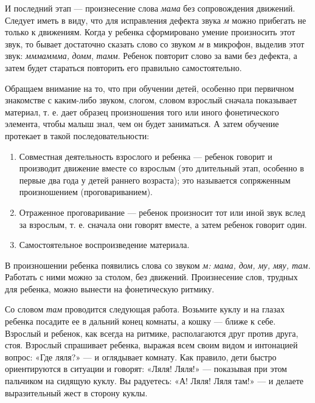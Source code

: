 \documentclass[a5paper]{book}
\renewcommand{\emph}[1]{\textit{#1}}
\begin{document}
И последний этап --- произнесение слова \emph{мама} без сопровождения
движений. Следует иметь в виду, что для исправления дефекта звука
\emph{м} можно прибегать не только к движениям. Когда у ребенка
сформировано умение произносить этот звук, то бывает достаточно сказать
слово со звуком \emph{м} в микрофон, выделив этот звук: \emph{мммаммма,}
\emph{домм}, \emph{тамм}. Ребенок повторит слово за вами без дефекта, а
затем будет стараться повторить его правильно самостоятельно.

Обращаем внимание на то, что при обучении детей, особенно при первичном
знакомстве с каким-либо звуком, слогом, словом взрослый сначала
показывает материал, т. е. дает образец произношения того или иного
фонетического элемента, чтобы малыш знал, чем он будет заниматься. А
затем обучение протекает в такой последовательности:


\begin{enumerate}
\def\labelenumi{\arabic{enumi}.}
\item
  
  Совместная деятельность взрослого и ребенка --- ребенок говорит и
  производит движение вместе со взрослым (это длительный этап, особенно
  в первые два года у детей раннего возраста); это называется
  сопряженным произношением (проговариванием).
  
\item
  
  Отраженное проговаривание --- ребенок произносит тот или иной звук
  вслед за взрослым, т. е. сначала они говорят вместе, а затем ребенок
  говорит один.
  
\item
  
  Самостоятельное воспроизведение материала.
  
\end{enumerate}


В произношении ребенка появились слова со звуком \emph{м: мама, дом, му,
мяу, там.} Работать с ними можно за столом, без движений. Произнесение
слов, трудных для ребенка, можно вынести на фонетическую ритмику.

Со словом \emph{там} проводится следующая работа. Возьмите куклу и на
глазах ребенка посадите ее в дальний конец комнаты, а кошку --- ближе к
себе. Взрослый и ребенок, как всегда на ритмике, располагаются друг
против друга, стоя. Взрослый спрашивает ребенка, выражая всем своим
видом и интонацией вопрос: «Где ляля?» --- и оглядывает комнату. Как
правило, дети быстро ориентируются в ситуации и говорят: «Ляля! Ляля!»
--- показывая при этом пальчиком на сидящую куклу. Вы радуетесь: «А!
Ляля! Ляля там!» --- и делаете выразительный жест в сторону куклы.
\end{document}
